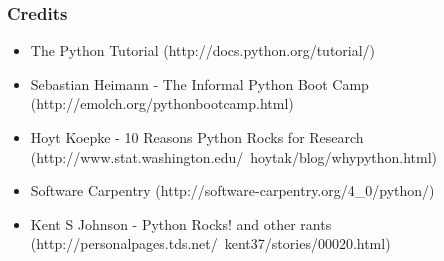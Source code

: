 \documentclass[t,9pt,compress=false,usepdftitle=false]{beamer}
\title[Python Intro]{\parbox[c][][c]{0.7\paperwidth}{\centering ObsPy workshop
2012\\
Python Introduction}}
\date[Zurich 2012-09-06]{2012-09-06}
\begin{document}
\maketitle






\begin{frame}[fragile]
\frametitle {Credits}
    \begin{itemize}
    \item The Python Tutorial (http://docs.python.org/tutorial/)
    \item Sebastian Heimann - The Informal Python Boot Camp (http://emolch.org/pythonbootcamp.html)
    \item Hoyt Koepke - 10 Reasons Python Rocks for Research (http://www.stat.washington.edu/~hoytak/blog/whypython.html)
    \item Software Carpentry (http://software-carpentry.org/4\_0/python/)
    \item Kent S Johnson - Python Rocks! and other rants (http://personalpages.tds.net/~kent37/stories/00020.html)
    \end{itemize}
\end{frame}
\end{document}
